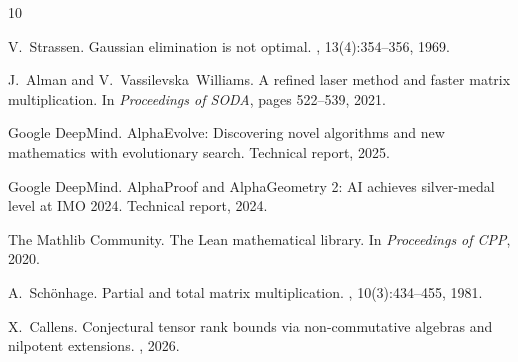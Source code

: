 \documentclass[11pt,a4paper]{article}
\begin{document}
\begin{thebibliography}{10}

V.~Strassen.
\newblock Gaussian elimination is not optimal.
, 13(4):354--356, 1969.

J.~Alman and V.~Vassilevska~Williams.
\newblock A refined laser method and faster matrix multiplication.
\newblock In {\em Proceedings of SODA}, pages 522--539, 2021.

Google DeepMind.
\newblock AlphaEvolve: Discovering novel algorithms and new mathematics
  with evolutionary search.
\newblock Technical report, 2025.

Google DeepMind.
\newblock AlphaProof and AlphaGeometry 2: AI achieves silver-medal
  level at IMO 2024.
\newblock Technical report, 2024.

The Mathlib Community.
\newblock The {L}ean mathematical library.
\newblock In {\em Proceedings of CPP}, 2020.

A.~Sch\"onhage.
\newblock Partial and total matrix multiplication.
, 10(3):434--455, 1981.

X.~Callens.
\newblock Conjectural tensor rank bounds via non-commutative algebras
  and nilpotent extensions.
, 2026.

\end{thebibliography}
\end{document}
